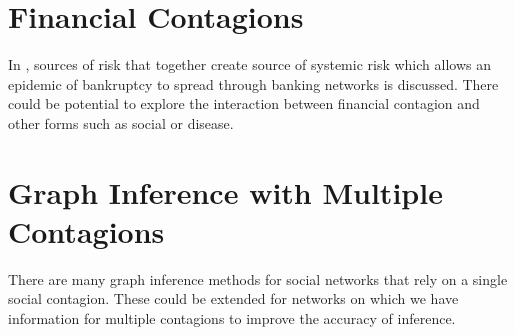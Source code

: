 \documentclass[11pt]{article}
\begin{document}
\section{Financial Contagions}
In \cite{CACCIOLI201550}, sources of risk that together create source of systemic risk which allows an epidemic of bankruptcy to spread through banking networks is discussed. There could be potential to explore the interaction between financial contagion and other forms such as social or disease.

\section{Graph Inference with Multiple Contagions}
There are many graph inference methods for social networks that rely on a single social contagion. These could be extended for networks on which we have information for multiple contagions to improve the accuracy of inference.






\end{document}
